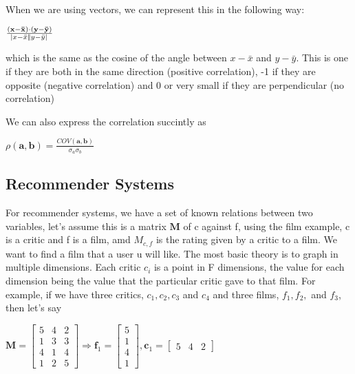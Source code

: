 \documentclass[10pt,a4paper]{article}
\begin{document}
			 When we are using vectors, we can represent this in the following way:
			 \begin{center}
			 	$ \frac {
			 		(\mathbf{x}-\mathbf{\bar x}) \cdot (\mathbf{y}-\mathbf{\bar y})
			 	}{
				 	\abs{x-\bar x} \abs{y - \bar y}
			 	}
			 		 $
			 \end{center}
			 which is the same as the cosine of the angle between $x-\bar x$ and $y - \bar y$. This is one if they are both in the same direction (positive correlation), -1 if they are opposite (negative correlation) and 0 or very small if they are perpendicular (no correlation)
			 
			 We can also express the correlation succintly as 
			 
			 \begin{center}
			 	$\rho(\textbf{a}, \textbf{b}) = \frac{COV(\textbf{a}, \textbf{b})}{\sigma_a \sigma_b}$
			 \end{center}
			 
		\subsection{Recommender Systems}
			For recommender systems, we have a set of known relations between two variables, let's assume this is a matrix $\bm M$ of c against f, using the film example, c is a critic and f is a film, amd $M_{c,f}$ is the rating given by a critic to a film. We want to find a film that a user u will like. The most basic theory is to graph in multiple dimensions. Each critic $c_i$ is a point in F dimensions, the value for each dimension being the value that the particular critic gave to that film. For example, if we have three critics, $c_1, c_2, c_3$ and $c_4$ and three films, $f_1, f_2,$ and $f_3$, then let's say
			
			\begin{center}
				$
					\bm M = \begin{bmatrix} 5 & 4 & 2 \\ 1 & 3 & 3 \\ 4 & 1 & 4 \\ 1 & 2 & 5 \end{bmatrix}  
					\Rightarrow
					\bm f_1 = \begin{bmatrix} 5 \\ 1 \\ 4 \\ 1 \end{bmatrix} , \bm c_1 = \begin{bmatrix} 5 & 4 & 2 \end{bmatrix}   
				$
			\end{center}
			
\end{document}
